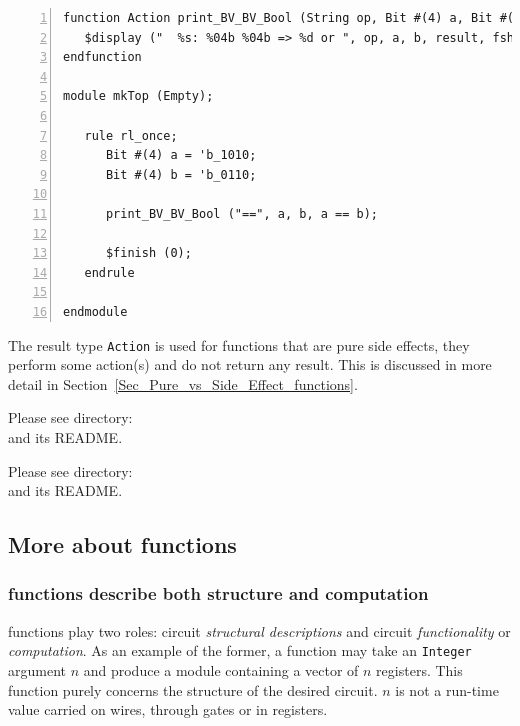 {\footnotesize
\begin{Verbatim}[frame=single, numbers=left]
function Action print_BV_BV_Bool (String op, Bit #(4) a, Bit #(4) b, Bool result);
   $display ("  %s: %04b %04b => %d or ", op, a, b, result, fshow (result));
endfunction

module mkTop (Empty);

   rule rl_once;
      Bit #(4) a = 'b_1010;
      Bit #(4) b = 'b_0110;

      print_BV_BV_Bool ("==", a, b, a == b);

      $finish (0);
   endrule

endmodule
\end{Verbatim}
}

The result type \verb|Action| is used for functions that are pure side
effects, {\ie} they perform some action(s) and do not return any
result.  This is discussed in more detail in
Section~\ref{Sec_Pure_vs_Side_Effect_functions}.

\Beginexercise

Please see directory:  \\
and its README.
\Endexercise


Please see directory:  \\
and its README.

\Endexercise


\subsection{More about {\BSV} functions}


\subsubsection{{\BSV} functions describe both structure and computation}


{\BSV} functions play two roles: circuit \emph{structural
descriptions} and circuit \emph{functionality} or \emph{computation}.
As an example of the former, a {\BSV} function may take an
\verb|Integer| argument $n$ and produce a module containing a vector
of $n$ registers.  This function purely concerns the structure of the
desired circuit.  $n$ is not a run-time value carried on wires,
through gates or in registers.

